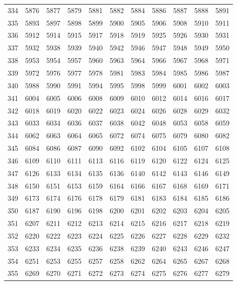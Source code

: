 \begin{longtable}{|r|rrrrrrrrrr|}
  334 & 5876 & 5877 & 5879 & 5881 & 5882 & 5884 & 5886 & 5887 & 5888 & 5891 \\ 
  335 & 5893 & 5897 & 5898 & 5899 & 5900 & 5905 & 5906 & 5908 & 5910 & 5911 \\ 
  336 & 5912 & 5914 & 5915 & 5917 & 5918 & 5919 & 5925 & 5926 & 5930 & 5931 \\ 
  337 & 5932 & 5938 & 5939 & 5940 & 5942 & 5946 & 5947 & 5948 & 5949 & 5950 \\ 
  338 & 5953 & 5954 & 5957 & 5960 & 5963 & 5964 & 5966 & 5967 & 5968 & 5971 \\ 
  339 & 5972 & 5976 & 5977 & 5978 & 5981 & 5983 & 5984 & 5985 & 5986 & 5987 \\ 
  340 & 5988 & 5990 & 5991 & 5994 & 5995 & 5998 & 5999 & 6001 & 6002 & 6003 \\ 
  341 & 6004 & 6005 & 6006 & 6008 & 6009 & 6010 & 6012 & 6014 & 6016 & 6017 \\ 
  342 & 6018 & 6019 & 6020 & 6022 & 6023 & 6024 & 6026 & 6028 & 6029 & 6032 \\ 
  343 & 6033 & 6034 & 6036 & 6037 & 6038 & 6042 & 6048 & 6053 & 6058 & 6059 \\ 
  344 & 6062 & 6063 & 6064 & 6065 & 6072 & 6074 & 6075 & 6079 & 6080 & 6082 \\ 
  345 & 6084 & 6086 & 6087 & 6090 & 6092 & 6102 & 6104 & 6105 & 6107 & 6108 \\ 
  346 & 6109 & 6110 & 6111 & 6113 & 6116 & 6119 & 6120 & 6122 & 6124 & 6125 \\ 
  347 & 6126 & 6133 & 6134 & 6135 & 6136 & 6140 & 6142 & 6143 & 6146 & 6149 \\ 
  348 & 6150 & 6151 & 6153 & 6159 & 6164 & 6166 & 6167 & 6168 & 6169 & 6171 \\ 
  349 & 6173 & 6174 & 6176 & 6178 & 6179 & 6181 & 6183 & 6184 & 6185 & 6186 \\ 
  350 & 6187 & 6190 & 6196 & 6198 & 6200 & 6201 & 6202 & 6203 & 6204 & 6205 \\ 
  351 & 6207 & 6211 & 6212 & 6213 & 6214 & 6215 & 6216 & 6217 & 6218 & 6219 \\ 
  352 & 6220 & 6222 & 6223 & 6224 & 6225 & 6226 & 6227 & 6228 & 6229 & 6232 \\ 
  353 & 6233 & 6234 & 6235 & 6236 & 6238 & 6239 & 6240 & 6243 & 6246 & 6247 \\ 
  354 & 6251 & 6253 & 6255 & 6257 & 6258 & 6262 & 6264 & 6265 & 6267 & 6268 \\ 
  355 & 6269 & 6270 & 6271 & 6272 & 6273 & 6274 & 6275 & 6276 & 6277 & 6279 \\ 

\end{longtable}
